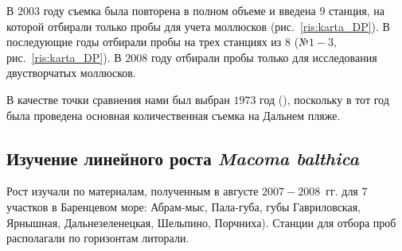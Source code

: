  В $2003$ году съемка была повторена в полном объеме и введена $9$ станция, на которой отбирали только пробы для учета моллюсков (рис.~\ref{ris:karta_DP}). 
 В последующие годы отбирали пробы на трех станциях из $8$ (№$1-3$, рис.~\ref{ris:karta_DP}). 
 В $2008$ году отбирали пробы только для исследования двустворчатых моллюсков.

 В качестве точки сравнения нами был выбран $1973$ год (\cite{Streltsov_et_al_1974, Agarova_et_al_1976}), поскольку в тот год была проведена основная количественная съемка на Дальнем пляже. 




	\subsection{Изучение линейного роста {\it Macoma balthica}}
Рост изучали по материалам, полученным в августе $2007 - 2008$~гг. для $7$ участков в Баренцевом море: Абрам-мыс, Пала-губа, губы Гавриловская, Ярнышная, Дальнезеленецкая, Шельпино, Порчниха).
Станции для отбора проб располагали по горизонтам литорали. 

